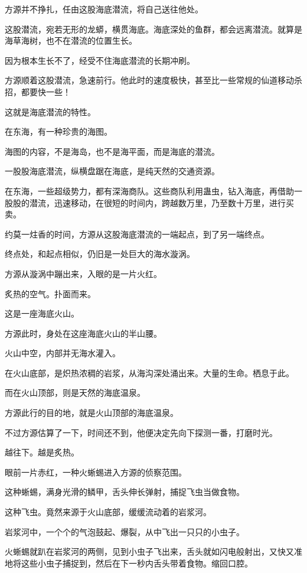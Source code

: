 \begin{this_body}
方源并不挣扎，任由这股海底潜流，将自己送往他处。

这股潜流，宛若无形的龙蟒，横贯海底。海底深处的鱼群，都会远离潜流。就算是海草海树，也不在潜流的位置生长。

因为根本生长不了，经受不住海底潜流的长期冲刷。

方源顺着这股潜流，急速前行。他此时的速度极快，甚至比一些常规的仙道移动杀招，都要快一些！

这就是海底潜流的特性。

在东海，有一种珍贵的海图。

海图的内容，不是海岛，也不是海平面，而是海底的潜流。

一股股海底潜流，纵横盘踞在海底，是纯天然的交通资源。

在东海，一些超级势力，都有深海商队。这些商队利用蛊虫，钻入海底，再借助一股股的潜流，迅速移动，在很短的时间内，跨越数万里，乃至数十万里，进行买卖。

约莫一炷香的时间，方源从这股海底潜流的一端起点，到了另一端终点。

终点处，和起点相似，仍旧是一处巨大的海水漩涡。

方源从漩涡中蹦出来，入眼的是一片火红。

炙热的空气。扑面而来。

这是一座海底火山。

方源此时，身处在这座海底火山的半山腰。

火山中空，内部并无海水灌入。

在火山底部，是炽热浓稠的岩浆，从海沟深处涌出来。大量的生命。栖息于此。

而在火山顶部，则是天然的海底温泉。

方源此行的目的地，就是火山顶部的海底温泉。

不过方源估算了一下，时间还不到，他便决定先向下探测一番，打磨时光。

越往下。越是炙热。

眼前一片赤红，一种火蜥蜴进入方源的侦察范围。

这种蜥蜴，满身光滑的鳞甲，舌头伸长弹射，捕捉飞虫当做食物。

这种飞虫。竟然来源于火山底部，缓缓流动着的岩浆河。

岩浆河中，一个个的气泡鼓起、爆裂，从中飞出一只只的小虫子。

火蜥蜴就趴在岩浆河的两侧，见到小虫子飞出来，舌头就如闪电般射出，又快又准地将这些小虫子捕捉到，然后在下一秒内舌头带着食物。缩回口腔。


\end{this_body}
